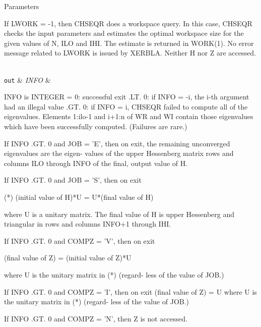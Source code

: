 \begin{DoxyParams}[1]{Parameters}
\begin{DoxyVerb}
           If LWORK = -1, then CHSEQR does a workspace query.
           In this case, CHSEQR checks the input parameters and
           estimates the optimal workspace size for the given
           values of N, ILO and IHI.  The estimate is returned
           in WORK(1).  No error message related to LWORK is
           issued by XERBLA.  Neither H nor Z are accessed.\end{DoxyVerb}
\\
\hline
\mbox{\tt out}  & {\em I\+N\+F\+O} & \begin{DoxyVerb}          INFO is INTEGER
             =  0:  successful exit
           .LT. 0:  if INFO = -i, the i-th argument had an illegal
                    value
           .GT. 0:  if INFO = i, CHSEQR failed to compute all of
                the eigenvalues.  Elements 1:ilo-1 and i+1:n of WR
                and WI contain those eigenvalues which have been
                successfully computed.  (Failures are rare.)

                If INFO .GT. 0 and JOB = 'E', then on exit, the
                remaining unconverged eigenvalues are the eigen-
                values of the upper Hessenberg matrix rows and
                columns ILO through INFO of the final, output
                value of H.

                If INFO .GT. 0 and JOB   = 'S', then on exit

           (*)  (initial value of H)*U  = U*(final value of H)

                where U is a unitary matrix.  The final
                value of  H is upper Hessenberg and triangular in
                rows and columns INFO+1 through IHI.

                If INFO .GT. 0 and COMPZ = 'V', then on exit

                  (final value of Z)  =  (initial value of Z)*U

                where U is the unitary matrix in (*) (regard-
                less of the value of JOB.)

                If INFO .GT. 0 and COMPZ = 'I', then on exit
                      (final value of Z)  = U
                where U is the unitary matrix in (*) (regard-
                less of the value of JOB.)

                If INFO .GT. 0 and COMPZ = 'N', then Z is not
                accessed.\end{DoxyVerb}
 \\
\hline
\end{DoxyParams}
